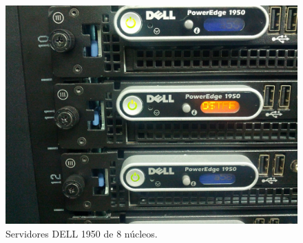 \begin{figure}[ht]
  \centering
  \includegraphics[scale=0.15]{imgs/dell.jpg}
  \caption{Servidores DELL 1950 de 8 núcleos.}
  \label{fig:dell}
\end{figure}




